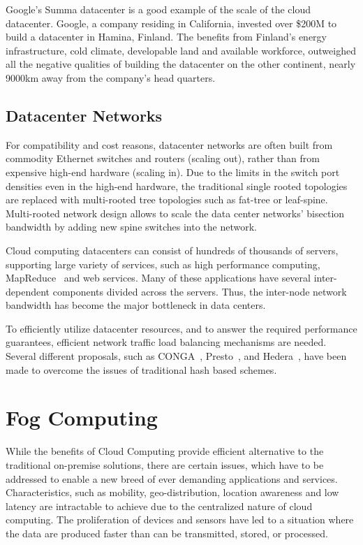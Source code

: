 Google's Summa datacenter is a good example of the scale of the cloud datacenter. Google, a company residing in California, invested over \$200M to build a datacenter in Hamina, Finland. The benefits from Finland's energy infrastructure, cold climate, developable land and available workforce, outweighed all the negative qualities of building the datacenter on the other continent, nearly 9000km away from the company's head quarters.~\cite{Google:2016:Summa}

\subsection{Datacenter Networks}
For compatibility and cost reasons, datacenter networks are often built from commodity Ethernet switches and routers (scaling out), rather than from expensive high-end hardware (scaling in). Due to the limits in the switch port densities even in the high-end hardware, the traditional single rooted topologies are replaced with multi-rooted tree topologies such as fat-tree or leaf-spine. Multi-rooted network design allows to scale the data center networks' bisection bandwidth by adding new spine switches into the network.~\cite{Al-Fares:2010:SO, Al-Fares:2008:SCD}

Cloud computing datacenters can consist of hundreds of thousands of servers, supporting large variety of services, such as high performance computing, MapReduce~\cite{Dean:2008:MR} and web services. Many of these applications have several inter-dependent components divided across the servers. Thus, the inter-node network bandwidth has become the major bottleneck in data centers.~\cite{Al-Fares:2008:SCD}

To efficiently utilize datacenter resources, and to answer the required performance guarantees, efficient network traffic load balancing mechanisms are needed. Several different proposals, such as CONGA~\cite{Alizadeh:2014:Conga},  Presto~\cite{He:2015:Presto}, and Hedera~\cite{Al-Fares:2010:Hedera}, have been made to overcome the issues of traditional hash based schemes.

\section{Fog Computing}
\label{section:fog-computing}

While the benefits of Cloud Computing provide efficient alternative to the traditional on-premise solutions, there are certain issues, which have to be addressed to enable a new breed of ever demanding applications and services. Characteristics, such as mobility, geo-distribution, location awareness and low latency are intractable to achieve due to the centralized nature of cloud computing. The proliferation of devices and sensors have led to a situation where the data are produced faster than can be transmitted, stored, or processed.~\cite{Bonomi:2012:Fog, Vaquero:2014:FYW}

